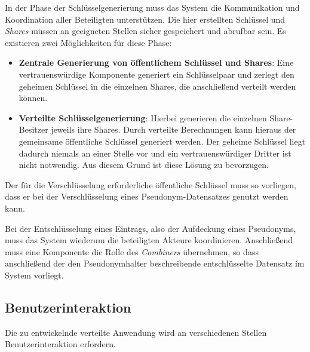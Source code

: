 In der Phase der Schlüsselgenerierung muss das System die Kommunikation und Koordination aller Beteiligten unterstützen. Die hier erstellten Schlüssel und \textit{Shares} müssen an geeigneten Stellen sicher gespeichert und abrufbar sein. Es existieren zwei Möglichkeiten für diese Phase:
\begin{itemize}
  \item \textbf{Zentrale Generierung von öffentlichem Schlüssel und Shares}: Eine vertrauenswürdige Komponente generiert ein Schlüsselpaar und zerlegt den geheimen Schlüssel in die einzelnen Shares, die anschließend verteilt werden können. 
  \item \textbf{Verteilte Schlüsselgenerierung}: Hierbei generieren die einzelnen Share-Besitzer jeweils ihre Shares. Durch verteilte Berechnungen kann hieraus der gemeinsame öffentliche Schlüssel generiert werden. Der geheime Schlüssel liegt dadurch niemals an einer Stelle vor und ein vertrauenswürdiger Dritter ist nicht notwendig. Aus diesem Grund ist diese Lösung zu bevorzugen.
\end{itemize}

Der für die Verschlüsselung erforderliche öffentliche Schlüssel muss so vorliegen, dass er bei der Verschlüsselung eines Pseudonym-Datensatzes genutzt werden kann.

Bei der Entschlüsselung eines Eintrags, also der Aufdeckung eines Pseudonyms, muss das System wiederum die beteiligten Akteure koordinieren. Anschließend muss eine Komponente die Rolle des \textit{Combiners} übernehmen, so dass anschließend der den Pseudonymhalter beschreibende entschlüsselte Datensatz im System  vorliegt.

\subsection{Benutzerinteraktion}

\label{subsec_impl_requirements_userinteraction}




Die zu entwickelnde verteilte Anwendung wird an verschiedenen Stellen Benutzerinteraktion erfordern.


